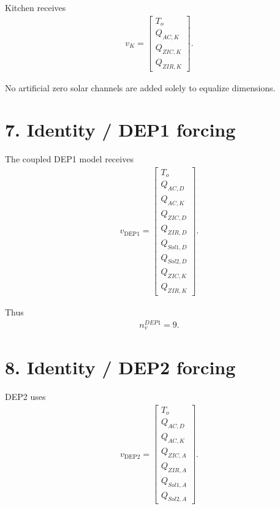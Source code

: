 \documentclass[11pt]{article}
\begin{document}
Kitchen receives
\begin{align}
\boxed{
v_K=
\begin{bmatrix}
T_o\\
Q_{AC,K}\\
Q_{ZIC,K}\\
Q_{ZIR,K}
\end{bmatrix}.
}
\tag{N3.6}
\end{align}

No artificial zero solar channels are added solely to equalize dimensions.

\section*{7. Identity / DEP1 forcing}

The coupled DEP1 model receives
\begin{align}
\boxed{
v_{\mathrm{DEP1}}
=
\begin{bmatrix}
T_o\\
Q_{AC,D}\\
Q_{AC,K}\\
Q_{ZIC,D}\\
Q_{ZIR,D}\\
Q_{Sol1,D}\\
Q_{Sol2,D}\\
Q_{ZIC,K}\\
Q_{ZIR,K}
\end{bmatrix}.
}
\tag{N3.7}
\end{align}

Thus
\begin{align}
\boxed{n_v^{DEP1}=9.}
\tag{N3.8}
\end{align}

\section*{8. Identity / DEP2 forcing}

DEP2 uses
\begin{align}
\boxed{
v_{\mathrm{DEP2}}
=
\begin{bmatrix}
T_o\\
Q_{AC,D}\\
Q_{AC,K}\\
Q_{ZIC,A}\\
Q_{ZIR,A}\\
Q_{Sol1,A}\\
Q_{Sol2,A}
\end{bmatrix}.
}
\tag{N3.9}
\end{align}
\end{document}
